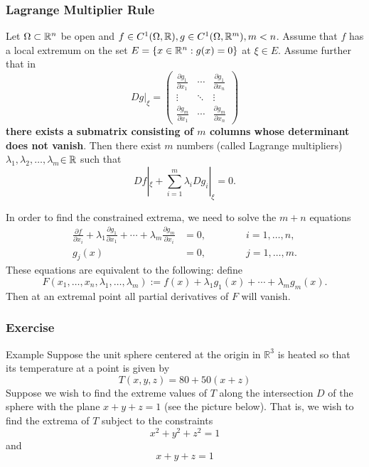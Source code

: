 \documentclass[10pt, t, allowdisplaybreaks]{beamer}
\newcommand{\myseries}[2]{$#1_1,#1_2,\dots,#1_#2$}
\begin{document}
\begin{frame}[allowframebreaks]
    \frametitle{Lagrange Multiplier Rule}

    Let $\Omega\subset\mathbb{R}^n$ be open and $f\in C^1(\Omega,\mathbb{R}),g\in C^1(\Omega,\mathbb{R}^m),m<n$. Assume that $f$ has a local extremum on the set $E=\{x\in\mathbb{R}^n:g(x)=0\}$ at $\xi\in E$. Assume further that in
    \[Dg|_\xi=\begin{pmatrix}
            \frac{\partial g_1}{\partial x_1} & \cdots & \frac{\partial g_1}{\partial x_n} \\
            \vdots                            & \ddots & \vdots                            \\
            \frac{\partial g_m}{\partial x_1} & \cdots & \frac{\partial g_m}{\partial x_n}
        \end{pmatrix}\]
    \textbf{there exists a submatrix consisting of $m$ columns whose determinant does
        not vanish}. Then there exist $m$ numbers (called Lagrange multipliers) \myseries{\lambda}{m}$\in\mathbb{R}$ such that
    \begin{equation}\label{2.7.4}
        Df|_\xi+\sum_{i=1}^{m}\lambda_i Dg_i|_\xi=0.
    \end{equation}

    In order to find the constrained extrema, we need to solve the $m + n$ equations
    \begin{align*}
        \frac{\partial f}{\partial x_i}+\lambda_1\frac{\partial g_1}{\partial x_1}+\cdots+\lambda_m\frac{\partial g_m}{\partial x_i} & =0,\qquad\qquad i=1,\ldots,n, \\
        g_j(x)                                                                                                                       & =0,\qquad\qquad j=1,\ldots,m.
    \end{align*}
    These equations are equivalent to the following: define
    \[F(x_1,\ldots,x_n,\lambda_1,\ldots,\lambda_m)
        :=f(x)+\lambda_1g_1(x)+\cdots+\lambda_mg_m(x).\]
    Then at an extremal point all partial derivatives of $F$ will vanish.
\end{frame}

\begin{frame}
    \frametitle{Exercise}
    Example Suppose the unit sphere centered at the origin in $\mathbb{R}^{3}$ is heated so that its temperature at a point is given by
    \[
        T(x, y, z)=80+50(x+z)
    \]
    Suppose we wish to find the extreme values of $T$ along the intersection $D$ of the sphere with the plane $x+y+z=1$ (see the picture below). That is, we wish to find the extrema of $T$ subject to the constraints
    \[
        x^{2}+y^{2}+z^{2}=1
    \]
    and
    \[
        x+y+z=1
    \]

\end{frame}
\end{document}
